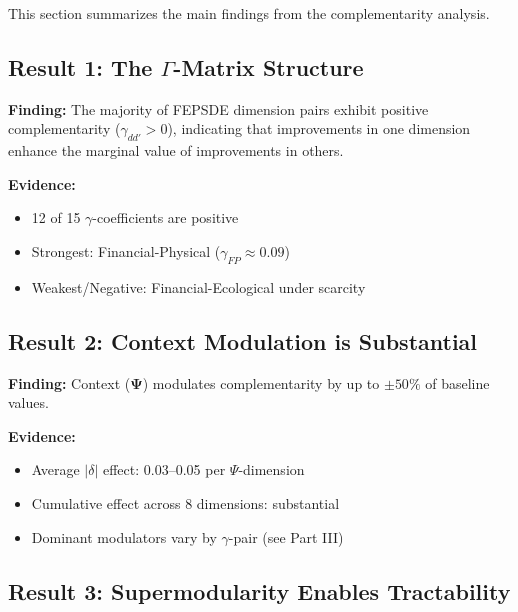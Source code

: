 This section summarizes the main findings from the complementarity analysis.

\subsection{Result 1: The $\Gamma$-Matrix Structure}

\begin{tcolorbox}[colback=green!5!white, colframe=green!75!black]
\textbf{Finding:} The majority of FEPSDE dimension pairs exhibit positive 
complementarity ($\gamma_{dd'} > 0$), indicating that improvements in one 
dimension enhance the marginal value of improvements in others.

\textbf{Evidence:} 
\begin{itemize}[nosep]
    \item 12 of 15 $\gamma$-coefficients are positive
    \item Strongest: Financial-Physical ($\gamma_{FP} \approx 0.09$)
    \item Weakest/Negative: Financial-Ecological under scarcity
\end{itemize}
\end{tcolorbox}

\subsection{Result 2: Context Modulation is Substantial}

\begin{tcolorbox}[colback=green!5!white, colframe=green!75!black]
\textbf{Finding:} Context ($\boldsymbol{\Psi}$) modulates complementarity by 
up to $\pm 50\%$ of baseline values.

\textbf{Evidence:}
\begin{itemize}[nosep]
    \item Average $|\delta|$ effect: 0.03--0.05 per $\Psi$-dimension
    \item Cumulative effect across 8 dimensions: substantial
    \item Dominant modulators vary by $\gamma$-pair (see Part III)
\end{itemize}
\end{tcolorbox}

\subsection{Result 3: Supermodularity Enables Tractability}


